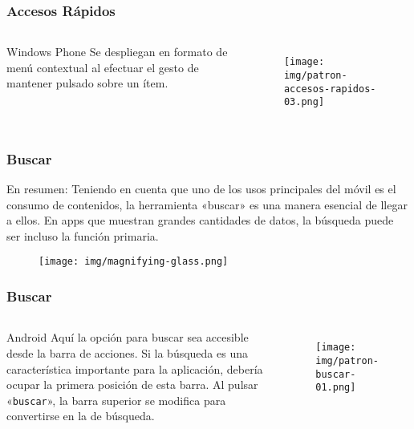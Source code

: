 \documentclass{beamer}
\begin{document}

\begin{frame}
\frametitle{Accesos Rápidos}

\begin{columns}[c] %

\begin{block}{Windows Phone}
\justify
Se despliegan en formato de menú contextual al efectuar el gesto de mantener pulsado sobre un ítem.
\end{block}

\begin{figure}[H]
  \centering
  \texttt{[image: img/patron-accesos-rapidos-03.png]}
\end{figure}
\end{columns}
\end{frame}


\begin{frame}
\frametitle{Buscar}

\begin{block}{En resumen:}
\justify
Teniendo en cuenta que uno de los usos principales del móvil es el consumo de contenidos, la herramienta «buscar» es una manera esencial de llegar a ellos. En apps que muestran grandes cantidades de datos, la búsqueda puede ser incluso la función primaria.
\end{block}

\begin{figure}[H]
  \centering
  \texttt{[image: img/magnifying-glass.png]}
\end{figure}
\end{frame}


\begin{frame}
\frametitle{Buscar}

\begin{columns}[c] %

\begin{block}{Android}
\justify
Aquí la opción para buscar sea accesible desde la barra de acciones. Si la búsqueda es una característica importante para la aplicación, debería ocupar la primera posición de esta barra. Al pulsar «\texttt{buscar}», la barra superior se modifica para convertirse en la de búsqueda.
\end{block}

\begin{figure}[H]
  \centering
  \texttt{[image: img/patron-buscar-01.png]}
\end{figure}
\end{columns}
\end{frame}
\end{document}
